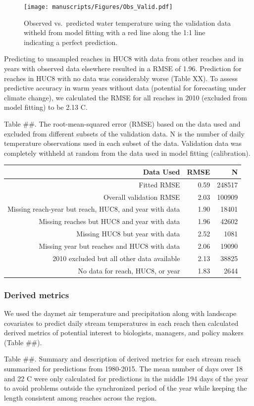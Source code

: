 \documentclass[]{article}
\begin{document}
\begin{figure}[htbp]
\centering
\texttt{[image: manuscripts/Figures/Obs\_Valid.pdf]}
\caption{Observed vs.~predicted water temperature using the validation
data witheld from model fitting with a red line along the 1:1 line
indicating a perfect prediction.}
\end{figure}

Predicting to unsampled reaches in HUC8 with data from other reaches and
in years with observed data elsewhere resulted in a RMSE of 1.96.
Prediction for reaches in HUC8 with no data was considerably worse
(Table XX). To assess predictive accuracy in warm years without data
(potential for forecasting under climate change), we calculated the RMSE
for all reaches in 2010 (excluded from model fitting) to be 2.13 C.

Table \#\#. The root-mean-squared error (RMSE) based on the data used
and excluded from different subsets of the validation data. N is the
number of daily temperature observations used in each subset of the
data. Validation data was completely withheld at random from the data
used in model fitting (calibration).

\begin{longtable}[c]{@{}rrr@{}}
\toprule
Data Used & RMSE & N\tabularnewline
\midrule
\endhead
Fitted RMSE & 0.59 & 248517\tabularnewline
Overall validation RMSE & 2.03 & 100909\tabularnewline
Missing reach-year but reach, HUC8, and year with data & 1.90 &
18401\tabularnewline
Missing reaches but HUC8 and year with data & 1.96 &
42602\tabularnewline
Missing HUC8 but year with data & 2.52 & 1081\tabularnewline
Missing year but reaches and HUC8 with data & 2.06 &
19090\tabularnewline
2010 excluded but all other data available & 2.13 & 38825\tabularnewline
No data for reach, HUC8, or year & 1.83 & 2644\tabularnewline
\bottomrule
\end{longtable}

\subsubsection{Derived metrics}\label{derived-metrics-1}

We used the daymet air temperature and precipitation along with
landscape covariates to predict daily stream temperatures in each reach
then calculated derived metrics of potential interest to biologists,
managers, and policy makers (Table \#\#).

Table \#\#. Summary and description of derived metrics for each stream
reach summarized for predictions from 1980-2015. The mean number of days
over 18 and 22 C were only calculated for predictions in the middle 194
days of the year to avoid problems outside the synchronized period of
the year while keeping the length consistent among reaches across the
region.
\end{document}
